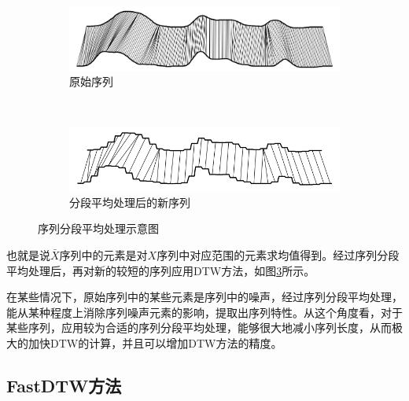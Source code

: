 \begin{figure}[h]
    \centering
    \begin{subfigure}[b]{0.45\textwidth}
        \includegraphics[width=\textwidth]{./figure/original.PNG}
        \caption{原始序列}
        \label{fig:subfig:original}
    \end{subfigure}
    ~ %
    \begin{subfigure}[b]{0.45\textwidth}
        \includegraphics[width=\textwidth]{./figure/new.PNG}
        \caption{分段平均处理后的新序列}
        \label{fig:subfig:new}
    \end{subfigure}
    \caption{序列分段平均处理示意图}\label{fig:9}
\end{figure}
也就是说$\bar{X}$序列中的元素是对$X$序列中对应范围的元素求均值得到。经过序列分段平均处理后，再对新的较短的序列应用DTW方法，如图\ref{fig:9}所示。

在某些情况下，原始序列中的某些元素是序列中的噪声，经过序列分段平均处理，能从某种程度上消除序列噪声元素的影响，提取出序列特性。从这个角度看，对于某些序列，应用较为合适的序列分段平均处理，能够很大地减小序列长度，从而极大的加快DTW的计算，并且可以增加DTW方法的精度。

\subsection{FastDTW方法}
